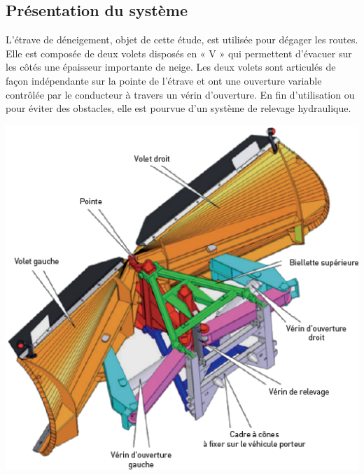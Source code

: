 \documentclass[10pt,fleqn]{article} %
\begin{document}
\def\pathfig{images}

\vspace{4.5cm}
\pagestyle{fancy}
\thispagestyle{plain}

\def\columnseprulecolor{\color{ocre}}
\setlength{\columnseprule}{0.4pt} 

\def\pathfig{images}

\ifprof
\else
\begin{multicols}{2}
\fi


\subsection*{Présentation du système}
L’étrave de déneigement, objet de cette étude, est utilisée pour dégager les routes. Elle est composée de deux volets disposés en « V » qui permettent d’évacuer sur les côtés une épaisseur importante de neige. Les deux volets sont articulés de façon indépendante sur la
pointe de l’étrave et ont une ouverture variable contrôlée par le conducteur à travers
un vérin d’ouverture. En fin d’utilisation ou pour éviter des obstacles, elle est pourvue d’un système de relevage hydraulique.
\begin{center}
\includegraphics[width=\linewidth]{images/fig_01}
\end{center}


\end{multicols}
\end{document}
